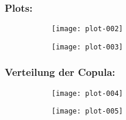 


\begin{frame}[containsverbatim]
  \frametitle{Plots:}
  \begin{figure}[h]  
    \centering
    \begin{minipage}[b]{.49\textwidth} %
      \begin{figure}[htpb]
        \centering

\texttt{[image: plot-002]}

      \end{figure}
    \end{minipage}
 \hspace{.0\linewidth}%
 \begin{minipage}[b]{.49\textwidth} %
   \begin{figure}[htb]

\texttt{[image: plot-003]}

   \end{figure}
 \end{minipage}
\end{figure}
\end{frame}


\begin{frame}[containsverbatim]
  \frametitle{Verteilung der Copula:}

\begin{figure}[h]  
  \centering
  \begin{minipage}[b]{.49\textwidth} %
    \begin{figure}[htpb]
      \centering
\texttt{[image: plot-004]}
   \end{figure}
 \end{minipage}
 \hspace{.0\linewidth}%
 \begin{minipage}[b]{.49\textwidth} %
   \begin{figure}[htb]
\texttt{[image: plot-005]}
   \end{figure}
 \end{minipage}
\end{figure}
\end{frame}

